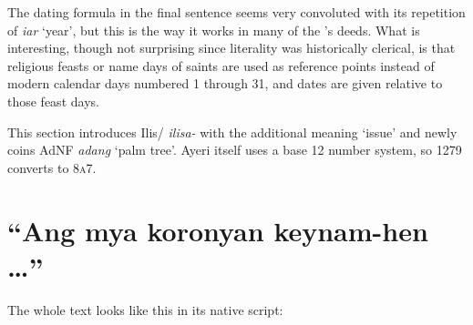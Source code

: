 \documentclass[12pt,paper=a4]{scrartcl}
\newcommand{\fw}[1]{\textit{#1}} %
\newcommand{\ayr}[1]{{\Tagati #1}}
\newcommand{\xayr}[3]{{\Tagati #1} \emph{#2} \enquote*{#3}}
\begin{document}
The dating formula in the final sentence seems very convoluted with its 
repetition of \fw{iar} `year', but this is the way it works in many of the 
's deeds. What is interesting, though not surprising since 
literality was historically clerical, is that religious feasts or name days of 
saints are used as reference points instead of modern calendar days numbered 1 
through 31, and dates are given relative to those feast days.

This section introduces \ayr{Ilis/} \fw{ilisa-} with the additional meaning 
`issue' and newly coins \xayr{AdNF}{adang}{palm tree}. Ayeri itself uses 
a base 12 number system, so 1279 converts to \textsc{8a7}.

\section{\enquote{Ang mya koronyan keynam-hen …}}

The whole text looks like this in its native script:
\end{document}
